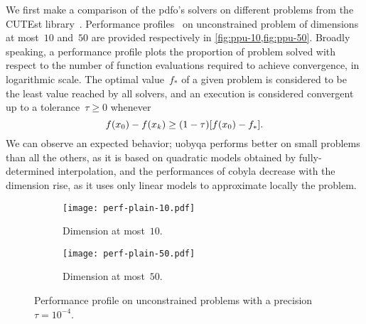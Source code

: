 \documentclass[11pt,draft]{article}
\numberwithin{equation}{section}
\newcommand{\iter}[1][k]{x\ifthenelse{\equal{#1}{}}{}{_{#1}}}
\newcommand{\obj}{f}
\begin{document}
We first make a comparison of the \gls{pdfo}'s solvers on different problems from the CUTEst library~\cite{Gould_Orban_Toint_2015}.
Performance profiles~\cite{Dolan_More_2002, More_Wild_2009} on unconstrained problem of dimensions at most~$10$ and~$50$ are provided respectively in \cref{fig:ppu-10,fig:ppu-50}.
Broadly speaking, a performance profile plots the proportion of problem solved with respect to the number of function evaluations required to achieve convergence, in logarithmic scale.
The optimal value~$\obj_{\ast}$ of a given problem is considered to be the least value reached by all solvers, and an execution is considered convergent up to a tolerance~$\tau \ge 0$ whenever
\begin{equation}
    \label{eq:cvt}
    \obj(\iter[0]) - \obj(\iter) \ge (1 - \tau) [\obj(\iter[0]) - \obj_{\ast}].
\end{equation}
We can observe an expected behavior; \gls{uobyqa} performs better on small problems than all the others, as it is based on quadratic models obtained by fully-determined interpolation, and the performances of \gls{cobyla} decrease with the dimension rise, as it uses only linear models to approximate locally the problem.

\begin{figure}[ht]
    \begin{subfigure}{.48\textwidth}
        \centering
        \texttt{[image: perf-plain-10.pdf]}
        \caption{Dimension at most~$10$.}
        \label{fig:ppu-10}
    \end{subfigure}
    \hfill
    \begin{subfigure}{.48\textwidth}
        \centering
        \texttt{[image: perf-plain-50.pdf]}
        \caption{Dimension at most~$50$.}
        \label{fig:ppu-50}
    \end{subfigure}
    \caption{Performance profile on unconstrained problems with a precision~$\tau = 10^{-4}$.}
\end{figure}
\end{document}
